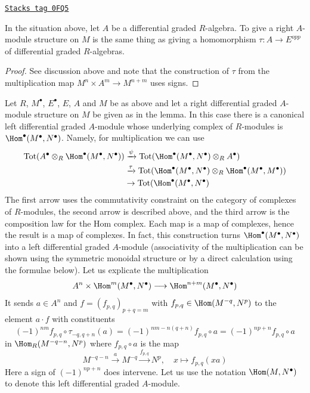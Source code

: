 \begin{lemma}
\label{dga-lemma-right-module-structure}
\href{https://stacks.math.columbia.edu/tag/0FQ5}{\texttt{Stacks tag 0FQ5}}

In the situation above, let $A$ be a differential graded $R$-algebra.
To give a right $A$-module structure on $M$ is the same thing as
giving a homomorphism $\tau : A \to E^{opp}$
of differential graded $R$-algebras.
\end{lemma}

\begin{proof}
See discussion above and note that the construction of $\tau$
from the multiplication map $M^n \times A^m \to M^{n + m}$
uses signs.
\end{proof}

Let $R$, $M^\bullet$, $E^\bullet$, $E$, $A$ and $M$ be as above
and let a right differential graded $A$-module structure on $M$
be given as in the lemma. In this case there is a canonical left
differential graded $A$-module whose underlying complex of $R$-modules is
$\Hom^\bullet(M^\bullet, N^\bullet)$. Namely, for multiplication
we can use
\begin{align*}
\text{Tot}(A^\bullet \otimes_R \Hom^\bullet(M^\bullet, N^\bullet))
& \xrightarrow{\psi}
\text{Tot}(\Hom^\bullet(M^\bullet, N^\bullet) \otimes_R A^\bullet) \\
& \xrightarrow{\tau}
\text{Tot}(\Hom^\bullet(M^\bullet, N^\bullet) \otimes_R
\Hom^\bullet(M^\bullet, M^\bullet)) \\
& \to
\text{Tot}(\Hom^\bullet(M^\bullet, N^\bullet)
\end{align*}
The first arrow uses the commutativity constraint on the category
of complexes of $R$-modules, the second arrow is described above, and
the third arrow is the composition law for the Hom complex.
Each map is a map of complexes, hence the result is a map of complexes.
In fact, this construction turns $\Hom^\bullet(M^\bullet, N^\bullet)$
into a left differential graded $A$-module (associativity of the multiplication
can be shown using the symmetric monoidal structure or by a direct calculation
using the formulae below). Let us explicate the multiplication
$$
A^n \times \Hom^m(M^\bullet, N^\bullet) \longrightarrow
\Hom^{n + m}(M^\bullet, N^\bullet)
$$
It sends $a \in A^n$ and
$f = (f_{p, q})_{p + q = m}$ with $f_{p, q} \in \Hom(M^{-q}, N^p)$
to the element $a \cdot f$ with constituents
$$
(-1)^{nm}f_{p, q} \circ \tau_{-q, q + n}(a) =
(-1)^{nm - n(q + n)}f_{p, q} \circ a =
(-1)^{np + n} f_{p, q} \circ a
$$
in $\Hom_R(M^{-q - n}, N^p)$ where $f_{p, q} \circ a$ is the map
$$
M^{-q - n} \xrightarrow{a} M^{-q} \xrightarrow{f_{p, q}} N^p,\quad
x \longmapsto f_{p, q}(xa)
$$
Here a sign of $(-1)^{np + n}$ does intervene.  Let us use the notation
$\Hom(M, N^\bullet)$ to denote this left differential graded $A$-module.

